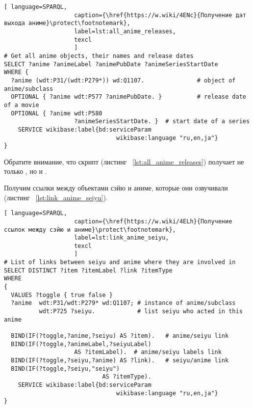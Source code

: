 \begin{lstlisting}[ language=SPARQL, 
                    caption={\href{https://w.wiki/4ENc}{Получение дат выхода аниме}\protect\footnotemark},
                    label=lst:all_anime_releases,
                    texcl 
                    ]
# Get all anime objects, their names and release dates
SELECT ?anime ?animeLabel ?animePubDate ?animeSeriesStartDate
WHERE {
  ?anime (wdt:P31/(wdt:P279*)) wd:Q1107.               # object of anime/subclass
  OPTIONAL { ?anime wdt:P577 ?animePubDate. }          # release date of a movie
  OPTIONAL { ?anime wdt:P580
					?animeSeriesStartDate. }  # start date of a series
    SERVICE wikibase:label{bd:serviceParam
					     		wikibase:language "ru,en,ja"}
}
\end{lstlisting}%

Обратите внимание, что скрипт (листинг ~\protect\ref{lst:all_anime_releases}) получает не только  , но и . 

Получим ссылки между объектами сэйю и аниме, которые они озвучивали (листинг ~\protect\ref{lst:link_anime_seiyu}).

\begin{lstlisting}[ language=SPARQL, 
                    caption={\href{https://w.wiki/4ELh}{Получение ссылок между сэйю и аниме}\protect\footnotemark},
                    label=lst:link_anime_seiyu,
                    texcl 
                    ]
# List of links between seiyu and anime where they are involved in
SELECT DISTINCT ?item ?itemLabel ?link ?itemType
WHERE
{
  VALUES ?toggle { true false }
  ?anime  wdt:P31/wdt:P279* wd:Q1107; # instance of anime/subclass
          wdt:P725 ?seiyu.            # list seiyu who acted in this anime
  
  BIND(IF(?toggle,?anime,?seiyu) AS ?item).   # anime/seiyu link
  BIND(IF(?toggle,?animeLabel,?seiyuLabel)
					AS ?itemLabel).  # anime/seiyu labels link
  BIND(IF(?toggle,?seiyu,?anime) AS ?link).   # seiyu/anime link
  BIND(IF(?toggle,?seiyu,"seiyu")
							AS ?itemType).
    SERVICE wikibase:label{bd:serviceParam
					     		wikibase:language "ru,en,ja"}
}
\end{lstlisting}%

